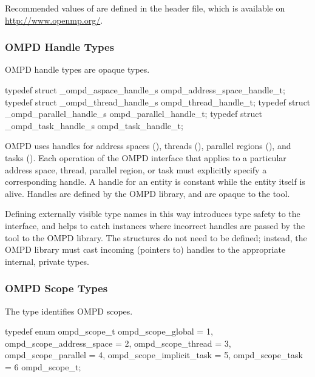 Recommended values of  are defined in the 
 header file, which is available on 
\url{http://www.openmp.org/}.



\subsubsection{OMPD Handle Types}
\label{subsubsec:ompd_address_space_handle_t}
\label{subsubsec:ompd_thread_handle_t}
\label{subsubsec:ompd_parallel_handle_t}
\label{subsubsec:ompd_task_handle_t}

\summary
OMPD handle types are opaque types.

\format
\begin{ccppspecific}
\begin{ompSyntax}
typedef struct _ompd_aspace_handle_s ompd_address_space_handle_t;
typedef struct _ompd_thread_handle_s ompd_thread_handle_t;
typedef struct _ompd_parallel_handle_s ompd_parallel_handle_t;
typedef struct _ompd_task_handle_s ompd_task_handle_t;
\end{ompSyntax}
\end{ccppspecific}

\descr
OMPD uses handles for address spaces (),
threads (), parallel regions 
(), and tasks ().
Each operation of the OMPD interface that applies to a particular address 
space, thread, parallel region, or task must explicitly specify a corresponding 
handle. A handle for an entity is constant while the entity itself is alive. 
Handles are defined by the OMPD library, and are opaque to the tool.

Defining externally visible type names in this way introduces type safety to 
the interface, and helps to catch instances where incorrect handles are passed 
by the tool to the OMPD library. The structures do not need to be defined;
instead, the OMPD library must cast incoming (pointers to) handles to the 
appropriate internal, private types.



\subsubsection{OMPD Scope Types}
\label{subsubsec:ompd_scope_t}

\summary
The  type identifies OMPD scopes.

\format
\begin{ccppspecific}
\begin{ompSyntax}
typedef enum ompd_scope_t {
  ompd_scope_global = 1,
  ompd_scope_address_space = 2,
  ompd_scope_thread = 3,
  ompd_scope_parallel = 4,
  ompd_scope_implicit_task = 5,
  ompd_scope_task = 6
} ompd_scope_t;
\end{ompSyntax}
\end{ccppspecific}

